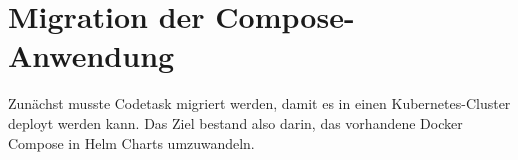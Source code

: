 \section{Migration der Compose-Anwendung}
Zunächst musste Codetask migriert werden, damit es in einen Kubernetes-Cluster deployt werden kann.
Das Ziel bestand also darin, das vorhandene Docker Compose in Helm Charts umzuwandeln.





